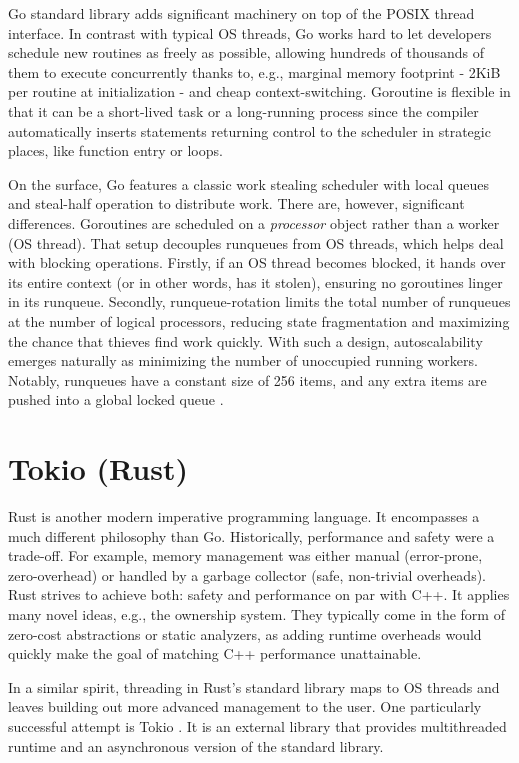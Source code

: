 \documentclass[12pt,a4paper,twoside]{report}
\begin{document}
Go standard library adds significant machinery on top of the POSIX thread interface. In contrast with typical OS threads, Go works hard to let developers schedule new routines as freely as possible, allowing hundreds of thousands of them to execute concurrently thanks to, e.g., marginal memory footprint - 2KiB per routine at initialization - and cheap context-switching. Goroutine is flexible in that it can be a short-lived task or a long-running process since the compiler automatically inserts statements returning control to the scheduler in strategic places, like function entry or loops. 

On the surface, Go features a classic work stealing scheduler with local queues and steal-half operation to distribute work. There are, however, significant differences. Goroutines are scheduled on a \textit{processor} object rather than a worker (OS thread). That setup decouples runqueues from OS threads, which helps deal with blocking operations. Firstly, if an OS thread becomes blocked, it hands over its entire context (or in other words, has it stolen), ensuring no goroutines linger in its runqueue. Secondly, runqueue-rotation limits the total number of runqueues at the number of logical processors, reducing state fragmentation and maximizing the chance that thieves find work quickly. With such a design, autoscalability emerges naturally as minimizing the number of unoccupied running workers. Notably, runqueues have a constant size of 256 items, and any extra items are pushed into a global locked queue \cite{goprocgo7:online}. 


\section{Tokio (Rust)}
\label{section:rel-work-rust}
Rust is another modern imperative programming language. It encompasses a much different philosophy than Go. Historically, performance and safety were a trade-off. For example, memory management was either manual (error-prone, zero-overhead) or handled by a garbage collector (safe, non-trivial overheads). Rust strives to achieve both: safety and performance on par with C++. It applies many novel ideas, e.g., the ownership system. They typically come in the form of zero-cost abstractions or static analyzers, as adding runtime overheads would quickly make the goal of matching C++ performance unattainable. 

In a similar spirit, threading in Rust's standard library maps to OS threads and leaves building out more advanced management to the user. One particularly successful attempt is Tokio \cite{TokioAna8:online}. It is an external library that provides multithreaded runtime and an asynchronous version of the standard library.
\end{document}
